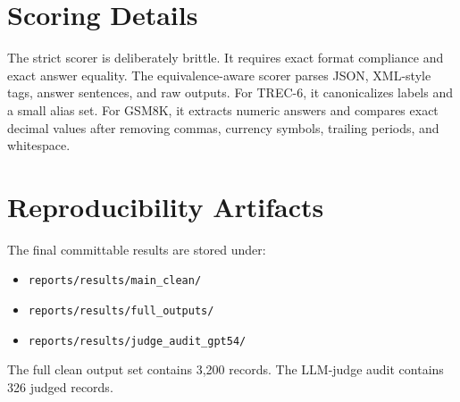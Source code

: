 \documentclass[11pt]{article}
\begin{document}
\section{Scoring Details}

The strict scorer is deliberately brittle. It requires exact format compliance and exact answer equality. The equivalence-aware scorer parses JSON, XML-style tags, answer sentences, and raw outputs. For TREC-6, it canonicalizes labels and a small alias set. For GSM8K, it extracts numeric answers and compares exact decimal values after removing commas, currency symbols, trailing periods, and whitespace.

\section{Reproducibility Artifacts}

The final committable results are stored under:

\begin{itemize}[leftmargin=*]
    \item \texttt{reports/results/main\_clean/}
    \item \texttt{reports/results/full\_outputs/}
    \item \texttt{reports/results/judge\_audit\_gpt54/}
\end{itemize}

The full clean output set contains 3,200 records. The LLM-judge audit contains 326 judged records.



\end{document}
